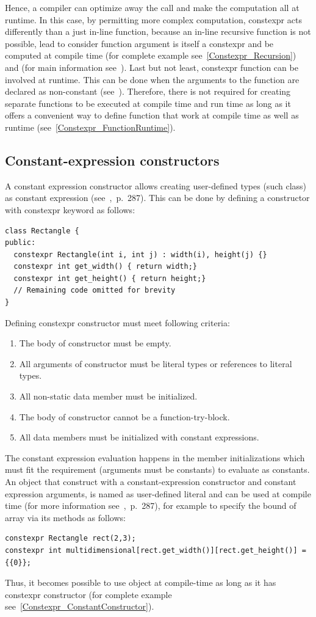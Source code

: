 \documentclass[11pt]{report}
\begin{document}
Hence, a compiler can optimize away the call and make the computation all at runtime. In this case, by permitting more complex computation, constexpr acts differently than a just in-line function, because an in-line recursive function is not possible, lead to consider function argument is itself a constexpr and be computed at compile time (for complete example see~\ref{Constexpr_Recursion}) and (for main information see~\cite{Allain:2011:FutureCpp}). Last but not least, constexpr function can be involved at runtime. This can be done when the arguments to the function are declared as non-constant (see~\cite{Allain:2011:FutureCpp}). Therefore, there is not required for creating separate functions to be executed at compile time and run time as long as it offers a convenient way to define function that work at compile time as well as runtime (see~\ref{Constexpr_FunctionRuntime}).

\subsection{Constant-expression constructors}
\label{subsection: Constant Expression Constructors}
A constant expression constructor allows creating user-defined types (such class) as constant expression (see~\cite{Gregorie:professionalcpp},~p.~287). This can be done by defining a constructor with constexpr keyword as follows:
\begin{lstlisting}
class Rectangle {
public:
  constexpr Rectangle(int i, int j) : width(i), height(j) {}
  constexpr int get_width() { return width;}
  constexpr int get_height() { return height;}
  // Remaining code omitted for brevity
}
\end{lstlisting}
Defining constexpr constructor must meet following criteria:
\begin{enumerate}
\item	The body of constructor must be empty.
\item	All arguments of constructor must be literal types or references to literal types.
\item   All non-static data member must be initialized.
\item	The body of constructor cannot be a function-try-block.
\item	All data members must be initialized with constant expressions.
\end{enumerate}
The constant expression evaluation happens in the member initializations which must fit the requirement (arguments must be constants) to evaluate as constants. An object that construct with a constant-expression constructor and constant expression arguments, is named as user-defined literal and can be used at compile time (for more information see~\cite{Gregorie:professionalcpp},~p.~287), for example to specify the bound of array via its methods as follows:
\begin{lstlisting}
constexpr Rectangle rect(2,3);
constexpr int multidimensional[rect.get_width()][rect.get_height()] = {{0}};
\end{lstlisting}
Thus, it becomes  possible to use object at compile-time as long as it has constexpr constructor (for complete example see~\ref{Constexpr_ConstantConstructor}).
\end{document}
